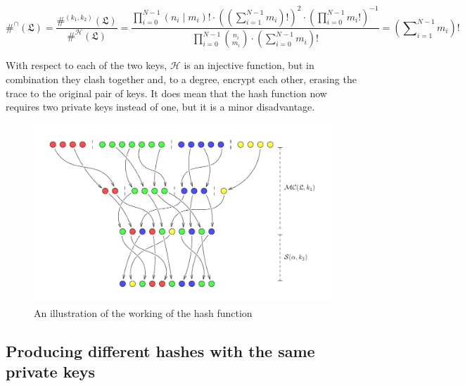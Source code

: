 \documentclass[12pt, a4paper]{article}
\renewcommand{\H}{\mathcal{H}}
\newcommand{\conf}{\mathfrak{L}}
\begin{document}
\begin{itemize}
        \begin{equation}
            \#^{\cap}(\conf) = \frac{\#^{(k_1, k_2)}(\conf)}{\#^{\H}(\conf)} = \frac{\prod\limits_{i = 0}^{N-1} (n_i \mid m_i)! \cdot \left(\left( \sum\nolimits_{i = 1}^{N-1} m_i \right)!\right)^2 \cdot \left( \prod\nolimits_{i = 0}^{N-1} m_i! \right)^{-1}}{\prod\limits_{i = 0}^{N-1} {{n_i}\choose{m_i}} \cdot \left(\sum\nolimits_{i = 0}^{N-1} m_i\right)!} = \left( \sum\nolimits_{i = 1}^{N-1} m_i \right)!
        \end{equation}
\end{itemize}

With respect to each of the two keys, $ \H $ is an injective function, but in combination they clash together and, to a degree, encrypt each other, erasing the trace to the original pair of keys. It does mean that the hash function now requires two private keys instead of one, but it is a minor disadvantage.

\begin{figure}[h]
    \centering
    \includegraphics{figures/hash.pdf}
    \caption{An illustration of the working of the hash function}
    \label{fig:hash}
\end{figure}

\subsection{Producing different hashes with the same private keys}
\end{document}

